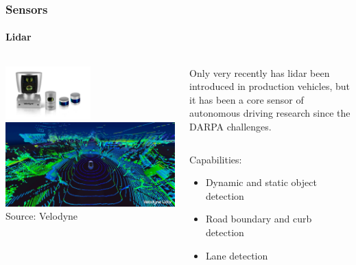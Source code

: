 \begin{frame}
\frametitle{Sensors}
\framesubtitle{Lidar}
\begin{columns}[T]
    \begin{column}{.5\textwidth}
        \centering
        \includegraphics[width=0.5\textwidth]{images/velodyne_lidars.png}\\
        \vspace{0.2cm}
        \includegraphics[width=\textwidth]{images/velodyne_pointcloud.jpg}\\
        \tiny{Source: Velodyne\footnotemark[1]}
    \end{column}
    \begin{column}{.5\textwidth}
        \footnotesize
        Only very recently has lidar been introduced in production vehicles, but it has
        been a core sensor of autonomous driving research since the DARPA challenges.
        \vspace{0.2cm}
        \begin{columns}[T]
            \begin{column}{0.4\textwidth}
                \footnotesize
                Capabilities:
                \begin{itemize}
                    \item Dynamic and static object detection
                    \item Road boundary and curb detection
                    \item Lane detection

\end{itemize}
\end{column}
\end{columns}
\end{column}
\end{columns}
\end{frame}
